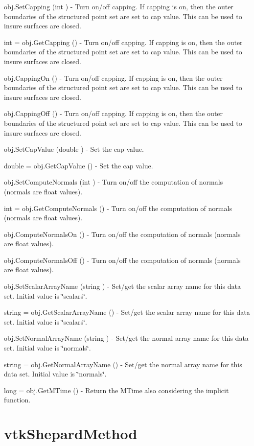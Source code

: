\begin{DoxyItemize}
\item {\ttfamily obj.\-Set\-Capping (int )} -\/ Turn on/off capping. If capping is on, then the outer boundaries of the structured point set are set to cap value. This can be used to insure surfaces are closed.  
\item {\ttfamily int = obj.\-Get\-Capping ()} -\/ Turn on/off capping. If capping is on, then the outer boundaries of the structured point set are set to cap value. This can be used to insure surfaces are closed.  
\item {\ttfamily obj.\-Capping\-On ()} -\/ Turn on/off capping. If capping is on, then the outer boundaries of the structured point set are set to cap value. This can be used to insure surfaces are closed.  
\item {\ttfamily obj.\-Capping\-Off ()} -\/ Turn on/off capping. If capping is on, then the outer boundaries of the structured point set are set to cap value. This can be used to insure surfaces are closed.  
\item {\ttfamily obj.\-Set\-Cap\-Value (double )} -\/ Set the cap value.  
\item {\ttfamily double = obj.\-Get\-Cap\-Value ()} -\/ Set the cap value.  
\item {\ttfamily obj.\-Set\-Compute\-Normals (int )} -\/ Turn on/off the computation of normals (normals are float values).  
\item {\ttfamily int = obj.\-Get\-Compute\-Normals ()} -\/ Turn on/off the computation of normals (normals are float values).  
\item {\ttfamily obj.\-Compute\-Normals\-On ()} -\/ Turn on/off the computation of normals (normals are float values).  
\item {\ttfamily obj.\-Compute\-Normals\-Off ()} -\/ Turn on/off the computation of normals (normals are float values).  
\item {\ttfamily obj.\-Set\-Scalar\-Array\-Name (string )} -\/ Set/get the scalar array name for this data set. Initial value is \char`\"{}scalars\char`\"{}.  
\item {\ttfamily string = obj.\-Get\-Scalar\-Array\-Name ()} -\/ Set/get the scalar array name for this data set. Initial value is \char`\"{}scalars\char`\"{}.  
\item {\ttfamily obj.\-Set\-Normal\-Array\-Name (string )} -\/ Set/get the normal array name for this data set. Initial value is \char`\"{}normals\char`\"{}.  
\item {\ttfamily string = obj.\-Get\-Normal\-Array\-Name ()} -\/ Set/get the normal array name for this data set. Initial value is \char`\"{}normals\char`\"{}.  
\item {\ttfamily long = obj.\-Get\-M\-Time ()} -\/ Return the M\-Time also considering the implicit function.  
\end{DoxyItemize}\hypertarget{vtkimaging_vtkshepardmethod}{}\section{vtk\-Shepard\-Method}\label{vtkimaging_vtkshepardmethod}

